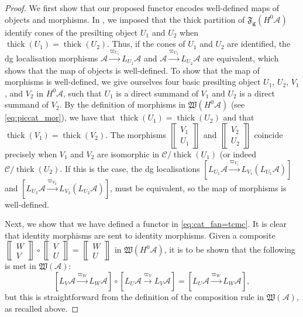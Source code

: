 \documentclass[10pt,twoside, a4paper,reqno]{amsart}
\DeclareMathOperator{\thick}{thick}
\newcommand{\partfan}[1]{\mathfrak{F}_{\bfg}(#1)}
\newcommand{\sqbinom}[2]{\left\llbracket \!\begin{smallmatrix} #1 \\ #2 \end{smallmatrix}\!\right\rrbracket}
\newcommand{\tcmc}[1]{\mathfrak{W}(#1)}
\newcommand{\A}{\mathscr{A}}
\newcommand{\Wfrak}{\mathfrak{W}}
\newcommand{\calC}{\mathcal{C}}
\newcommand{\bfg}{\mathbf{g}}
\theoremstyle{definition}
\begin{document}
\begin{proof}
    We first show that our proposed functor encodes well-defined maps of objects and morphisms.
    In , we imposed that the thick partition of $\partfan{H^0\A}$ identify cones of the presilting object ${U_1}$ and ${U_2}$ when $\thick(U_1)=\thick(U_2)$. Thus, if the cones of ${U_1}$ and ${U_2}$ are identified, the dg localisation morphisms $\A\xrightarrow{\varpi_{U_1}}  {L_{U_1}\A}$ and $\A\xrightarrow{\varpi_{U_2}}  {L_{U_2}\A}$ are equivalent, which shows that the map of objects is well-defined. To show that the map of morphisms is well-defined, we give ourselves four basic presilting object $U_1$, $U_2$, $V_1$, and $V_2$ in $H^0\A$, such that $U_1$ is a direct summand of $V_1$ and $U_2$ is a direct summand of $V_2$. 
    By the definition of morphisms in $\Wfrak(H^0\A)$ (see \eqref{eq:piccat_mor}), we have that $\thick(U_1)=\thick(U_2)$ and that $\thick(V_1)=\thick(V_2)$.
    The morphisms $\sqbinom{V_1}{U_1}$ and $\sqbinom{V_2}{U_2}$ coincide precisely when $V_1$ and $V_2$ are isomorphic in $\calC/\thick(U_1)$ (or indeed $\calC/\thick(U_2)$. 
    If this is the case, the dg localisations $[ {L_{U_1}\A} \xrightarrow{\varpi_{V_1}} {L_{V_1}}({L_{U_1}\A} )]$ and $[  {L_{U_2}\A} \xrightarrow{\varpi_{V_2}} {L_{V_2}}({L_{U_2}\A})]$, must be equivalent, so the map of morphisms is well-defined.

    Next, we show that we have defined a functor in \eqref{eq:cat_fan=tcmc}. It is clear that identity morphisms are sent to identity morphisms. Given a 
    composite $\sqbinom{W}{V}\circ\sqbinom{V}{U} = \sqbinom{W}{U}$ in $\tcmc{H^0\A}$, it is to be shown that the following is met in $\tcmc{\A}$: $$[{L_V\A} \xrightarrow{\varpi_W} {L_W\A}]\circ [{L_U\A} \xrightarrow{\varpi_V} {L_V\A}]=[{L_U\A} \xrightarrow{\varpi_W} {L_W\A}],$$ but this is straightforward from the definition of the composition rule in $\tcmc{\A}$, as recalled above. 


\end{proof}
\end{document}
